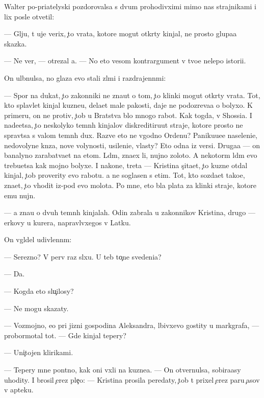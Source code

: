 \documentclass[10pt]{book}
\begin{document}
Walter po-pri{\y}atelyski pozdorovalsa s dvum{\ia} prohodivximi mimo nas strajnikami i lix posle otvetil:

— Gl{\ia}ju, t{\yi} uje verix, {\c}to vrata, kotor{\yi}{\y}e mogut otkr{\yi}ty kinjal{\yi}, ne prosto glupa{\y}a skazka.

— Ne ver{\iu}, — otrezal {\y}a. — No eto vesom{\yi}{\y} kontrargument v tvo{\y}e{\y} nelepo{\y} istori{\y}i.

On ul{\yi}bnulsa, no glaza {\y}evo stali zl{\yi}mi i razdrajenn{\yi}mi:

— Spor{\iu} na dukat, {\c}to zakonniki ne zna{\y}ut o tom, {\c}to klinki mogut otkr{\yi}ty vrata. Tot, kto splavl{\ia}{\y}et kinjal{\yi} kuzne{\q}u, dela{\y}et mal{\yi}{\y}e pakosti, daje ne podozreva{\y}a o bolyxo{\y}. K primeru, on ne protiv, {\c}tob{\yi} u Bratstva b{\yi}lo mnogo rabot{\yi}. Kak togda, v Shossi{\y}a. I nade{\y}etsa, {\c}to neskolyko temn{\yi}h kinjalov diskreditiru{\y}ut straje{\y}, kotor{\yi}{\y}e prosto ne sprav{\ia}tsa s valom temn{\yi}h dux. Razve eto ne v{\yi}godno Ordenu? Paniku{\y}u{\x}e{\y}e naseleni{\y}e, nedovolyn{\yi}{\y}e kn{\ia}z{\y}a, nov{\yi}{\y}e volynosti, usileni{\y}e, vlasty? Eto odna iz versi{\y}. Druga{\y}a — on banalyno zarabat{\yi}va{\y}et na etom. L{\iu}d{\ia}m, zna{\y}ex li, nujno zoloto. A nekotor{\yi}m l{\iu}d{\ia}m {\y}evo trebu{\y}etsa kak mojno bolyxe. I nakone{\q}, tret{\y}a — Kristina s{\c}ita{\y}et, {\c}to kuzne{\q} otdal kinjal, {\c}tob{\yi} proverity {\y}evo rabotu. {\Y}a ne soglasen s etim. Tot, kto sozda{\y}et tako{\y}e, zna{\y}et, {\c}to v{\yi}hodit iz-pod {\y}evo molota. Po mne, eto b{\yi}la plata za klinki straje{\y}, kotor{\yi}{\y}e {\y}emu nujn{\yi}.

— {\Y}a zna{\y}u o dvuh temn{\yi}h kinjalah. Odin zabrala u zakonnikov Kristina, drugo{\y} — {\q}erkovy u kur{\y}era, napravl{\ia}vxegos{\ia} v Latku.

On v{\yi}gl{\ia}del udivlenn{\yi}m:

— Ser{\y}ezno? V perv{\yi}{\y} raz sl{\yi}xu. U teb{\ia} to{\c}n{\yi}{\y}e svedeni{\y}a?

— Da.

— Kogda eto slu{\c}ilosy?

— Ne mogu skazaty.

— Vozmojno, {\y}e{\x}o pri jizni gospodina Aleksandra, l{\iu}bivxevo gostity u markgrafa, — probormotal tot. — Gde kinjal tepery?

— Uni{\c}tojen klirikami.

— Tepery mne pon{\ia}tno, kak oni v{\yi}xli na kuzne{\q}a. — On otvernulsa, sobira{\y}asy uhodity. I brosil {\c}erez ple{\c}o: — Kristina prosila peredaty, {\c}tob{\yi} t{\yi} prixel {\c}erez paru {\c}asov v apteku.
\end{document}
